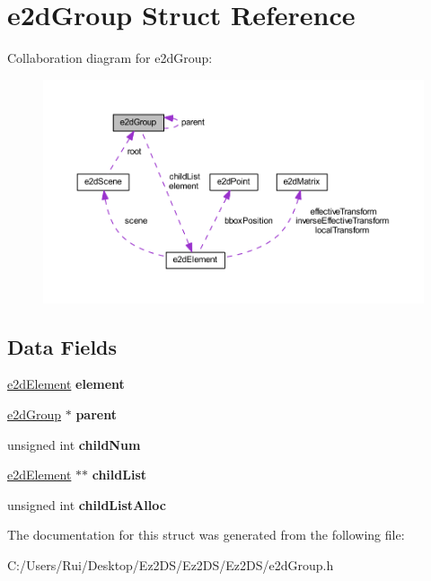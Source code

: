 \hypertarget{structe2d_group}{\section{e2d\-Group Struct Reference}
\label{structe2d_group}
}


Collaboration diagram for e2d\-Group\-:\nopagebreak
\begin{figure}[H]
\begin{center}
\leavevmode
\includegraphics[width=350pt]{structe2d_group__coll__graph}
\end{center}
\end{figure}
\subsection*{Data Fields}
\begin{DoxyCompactItemize}
\item 
\hypertarget{structe2d_group_a55bc7a3a0af41fba9e5b91f390c5928c}{\hyperlink{structe2d_element}{e2d\-Element} {\bfseries element}}\label{structe2d_group_a55bc7a3a0af41fba9e5b91f390c5928c}

\item 
\hypertarget{structe2d_group_a3e62eb2fbf1d6bc6d6fe549096a6cee9}{\hyperlink{structe2d_group}{e2d\-Group} $\ast$ {\bfseries parent}}\label{structe2d_group_a3e62eb2fbf1d6bc6d6fe549096a6cee9}

\item 
\hypertarget{structe2d_group_a0af3697c2c9df6ed0ddd340cded35d65}{unsigned int {\bfseries child\-Num}}\label{structe2d_group_a0af3697c2c9df6ed0ddd340cded35d65}

\item 
\hypertarget{structe2d_group_a55f6dde874716dc99dcd270fc0999a01}{\hyperlink{structe2d_element}{e2d\-Element} $\ast$$\ast$ {\bfseries child\-List}}\label{structe2d_group_a55f6dde874716dc99dcd270fc0999a01}

\item 
\hypertarget{structe2d_group_a9c89d7cf35b835ef1917855c78a79cc5}{unsigned int {\bfseries child\-List\-Alloc}}\label{structe2d_group_a9c89d7cf35b835ef1917855c78a79cc5}

\end{DoxyCompactItemize}


The documentation for this struct was generated from the following file\-:\begin{DoxyCompactItemize}
\item 
C\-:/\-Users/\-Rui/\-Desktop/\-Ez2\-D\-S/\-Ez2\-D\-S/\-Ez2\-D\-S/e2d\-Group.\-h\end{DoxyCompactItemize}
